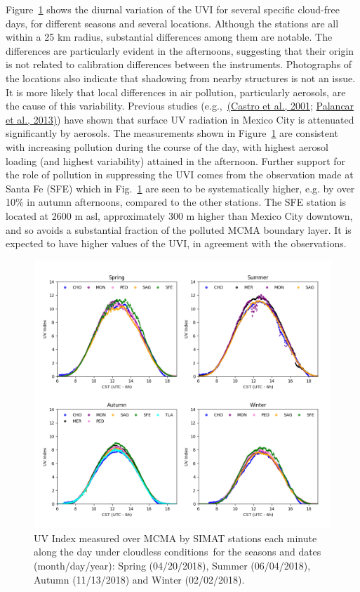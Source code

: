 \documentclass[10pt]{article}
\begin{document}
Figure~{\ref{358425}} shows the diurnal variation of
the UVI for several specific cloud-free days, for different seasons and
several locations. Although the stations are all within a 25 km radius,
substantial differences among them are notable. The differences are
particularly evident in the afternoons, suggesting that their origin is
not related to calibration differences between the instruments.
Photographs of the locations also indicate that shadowing from nearby
structures is not an issue. It is more likely that local differences in
air pollution, particularly aerosols, are the cause of this variability.
Previous studies (e.g.,~\hyperref[csl:14]{(Castro et al., 2001}; \hyperref[csl:13]{Palancar et al., 2013)}) have shown that surface UV
radiation in Mexico City is attenuated significantly by aerosols. The
measurements shown in Figure~{\ref{358425}} are
consistent with increasing pollution during the course of the day, with
highest aerosol loading (and highest variability) attained in the
afternoon. Further support for the role of pollution in suppressing the
UVI comes from the observation made at Santa Fe (SFE) which in
Fig.~{\ref{358425}} are seen to be systematically
higher, e.g. by over 10\% in autumn afternoons, compared to the other
stations. The SFE station is located at 2600 m asl, approximately 300 m
higher than Mexico City downtown, and so avoids a substantial fraction
of the polluted MCMA boundary layer. It is expected to have higher
values of the UVI, in agreement with the observations.
\begin{figure}[H]
\begin{center}
\includegraphics[width=0.98\columnwidth]{season}
\caption{{UV Index measured over MCMA by SIMAT stations each minute along the day
under cloudless conditions~for the seasons and dates (month/day/year):
Spring (04/20/2018), Summer (06/04/2018),~ Autumn (11/13/2018) and
Winter (02/02/2018).
{\label{358425}}%
}}
\end{center}
\end{figure}
\end{document}
